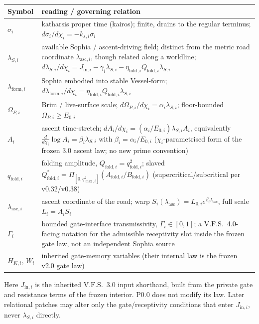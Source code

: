 \documentclass[11pt,a4paper]{article}
\newcommand{\VFS}{\ensuremath{\mathrm{V.F.S.}}}
\theoremstyle{definition}
\theoremstyle{plain}
\theoremstyle{remark}
\begin{document}
\begin{longtable}{>{\raggedright\arraybackslash}p{} >{\raggedright\arraybackslash}p{}}
\toprule
Symbol & 3.0 reading / governing relation \\
\midrule
$\sigma_i$ & katharsis proper time (kairos); finite, drains to the regular terminus; $d\sigma_i/d\chi_i=-k_{s,i}\sigma_i$ \\
$\lambda_{S,i}$ & available Sophia / ascent-driving field; distinct from the metric road coordinate $\lambda_{\mathrm{asc},i}$, though related along a worldline; $d\lambda_{S,i}/d\chi_i=J_{\mathrm{in},i}-\gamma_i\lambda_{S,i}-\eta_{\mathrm{fold},i}Q_{\mathrm{fold},i}\lambda_{S,i}$ \\
$\lambda_{\mathrm{form},i}$ & Sophia embodied into stable Vessel-form; $d\lambda_{\mathrm{form},i}/d\chi_i=\eta_{\mathrm{fold},i}Q_{\mathrm{fold},i}\lambda_{S,i}$ \\
$\Omega_{P,i}$ & Brim / live-surface scale; $d\Omega_{P,i}/d\chi_i=\alpha_i\lambda_{S,i}$; floor-bounded $\Omega_{P,i}\geq E_{0,i}$ \\
$A_i$ & ascent time-stretch; $dA_i/d\chi_i=(\alpha_i/E_{0,i})\lambda_{S,i}A_i$, equivalently $\tfrac{d}{d\chi_i}\log A_i=\beta_i\lambda_{S,i}$ with $\beta_i=\alpha_i/E_{0,i}$ ($\chi_i$-parametrised form of the frozen 3.0 ascent law; no new prime convention) \\
$q_{\mathrm{fold},i}$ & folding amplitude, $Q_{\mathrm{fold},i}=q_{\mathrm{fold},i}^2$; slaved $Q^*_{\mathrm{fold},i}=\Pi_{[0,q^2_{\max,i}]}(A_{\mathrm{fold},i}/B_{\mathrm{fold},i})$ (supercritical/subcritical per v0.32/v0.38) \\
$\lambda_{\mathrm{asc},i}$ & ascent coordinate of the road; warp $S_i(\lambda_{\mathrm{asc}})=L_{0,i}e^{\beta_i\lambda_{\mathrm{asc}}}$, full scale $L_i=A_iS_i$ \\
\midrule
$\Gamma_i$ & bounded gate-interface transmissivity, $\Gamma_i\in[0,1]$; a \VFS\ 4.0-facing notation for the admissible receptivity slot inside the frozen gate law, not an independent Sophia source \\
$H_{K,i},\,W_i$ & inherited gate-memory variables (their internal law is the frozen v2.0 gate law) \\
\bottomrule
\end{longtable}

Here $J_{\mathrm{in},i}$ is the inherited \VFS\ 3.0 input shorthand, built from the
private gate and resistance terms of the frozen interior. P0.0 does not modify its
law. Later relational patches may alter only the gate/receptivity conditions that
enter $J_{\mathrm{in},i}$, never $\lambda_{S,i}$ directly.
\end{document}
